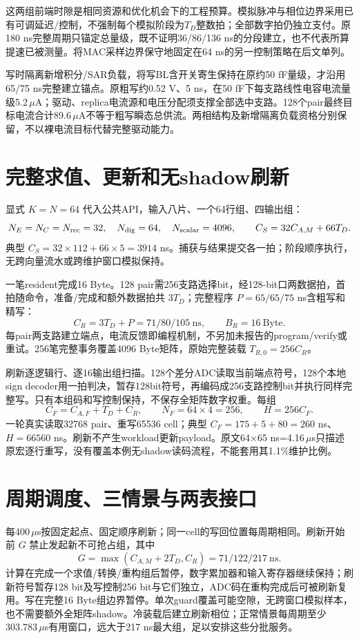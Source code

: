 这两组前端时隙是相同资源和优化机会下的工程预算。模拟脉冲与相位边界采用已有可调延迟/控制，不强制每个模拟阶段为$T_D$整数拍；全部数字拍仍独立支付。原180 ns完整周期只锚定总量级，既不证明36/86/136 ns的分段建立，也不代表所算提速已被测量。将MAC采样边界保守地固定在64 ns的另一控制策略在后文单列。

写时隔离新增积分/SAR负载，将写BL含开关寄生保持在原约50 fF量级，才沿用65/75 ns完整建立锚点。原粗写约0.52 V、5 ns，在50 fF下每支路线性电容电流量级5.2\,$\mu$A；驱动、replica电流源和电压分配须支撑全部选中支路。128个pair最终目标电流合计89.6\,$\mu$A不等于粗写瞬态总供流。两相结构及新增隔离负载资格分别保留，不以裸电流目标代替完整驱动能力。

\section{完整求值、更新和无shadow刷新}

显式 $K=N=64$ 代入公共API，输入八片、一个64行组、四输出组：
\[
N_E=N_C=N_{\rm rec}=32,\quad N_{\rm dig}=64,\quad N_{\rm scalar}=4096,
\qquad C_S=32C_{A,M}+66T_D.
\]
典型 $C_S=32\times112+66\times5=3914$ ns。捕获与结果提交各一拍；阶段顺序执行，无跨向量流水或跨维护窗口模拟保持。

一笔resident完成16 Byte。128 pair需256支路选择bit，经128-bit口两数据拍，首拍随命令，准备/完成和额外数据拍共 $3T_D$；完整程序 $P=65/65/75$ ns含粗写和精写：
\[
C_R=3T_D+P=71/80/105\ \mathrm{ns},\qquad B_R=16\ \mathrm{Byte}.
\]
每pair两支路建立端点，电流反馈即编程机制，不另加未报告的program/verify或重试。256笔完整事务覆盖4096 Byte矩阵，原始完整装载 $T_{R,0}=256C_R$。

刷新逐逻辑行、逐16输出组扫描。128个差分ADC读取当前端点符号，128个本地sign decoder用一拍判决，暂存128bit符号，再编码成256支路控制bit并执行同样完整写。只有本组码和写控制保持，不保存全矩阵数字权重。每组
\[
C_F=C_{A,F}+T_D+C_R,\qquad N_F=64\times4=256,\qquad H=256C_F.
\]
一轮真实读取32768 pair、重写65536 cell；典型 $C_F=175+5+80=260$ ns、$H=66560$ ns。刷新不产生workload更新payload。原文64×65 ns=4.16\,$\mu$s只描述原宏逐行重写，没有覆盖本例无shadow读码流程，不能套用其1.1\%维护比例。

\section{周期调度、三情景与两表接口}

每400\,$\mu$s按固定起点、固定顺序刷新；同一cell的写回位置每周期相同。刷新开始前 $G$ 禁止发起新不可抢占组，其中
\[
G=\max(C_{A,M}+2T_D,C_R)=71/122/217\ \mathrm{ns}.
\]
计算在完成一个求值/转换/重构组后暂停，数字累加器和输入寄存器继续保持；刷新符号暂存128 bit及写控制256 bit与它们独立，ADC码在重构完成后可被刷新复用。写在完整16 Byte组边界暂停。单次guard覆盖可能空隙，无跨窗口模拟样本，也不需要额外全矩阵shadow。冷装载后建立刷新相位；正常情景每周期至少303.783\,$\mu$s有用窗口，远大于217 ns最大组，足以安排这些分批服务。

